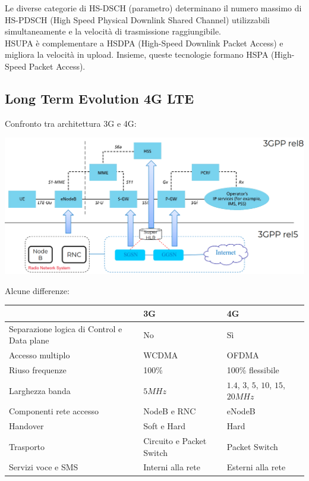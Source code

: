 Le diverse categorie di HS-DSCH (parametro) determinano il numero massimo di HS-PDSCH (High Speed Physical Downlink Shared Channel) utilizzabili simultaneamente e la velocità di trasmissione raggiungibile.\\

HSUPA è complementare a HSDPA (High-Speed Downlink Packet Access) e migliora la velocità in upload. Insieme, queste tecnologie formano HSPA (High-Speed Packet Access).\\


\newpage

\subsection{Long Term Evolution 4G LTE}

Confronto tra architettura 3G e 4G:
\begin{center}
	\includegraphics[width=0.95\linewidth]{img/mobile/3g4g}
\end{center}

Alcune differenze: 
\begin{center}
	\begin{tabular}{| m{3.5cm} | m{2cm} | m{2cm} |}
		\hline
		& 3G & 4G \\
		\hline
		Separazione logica di Control e Data plane &  No & Sì \\
		\hline
		Accesso multiplo  &WCDMA & OFDMA \\
		\hline
		Riuso frequenze & 100\% & 100\% flessibile \\
		\hline
		Larghezza banda & $5 MHz$ & $1.4$, $3$, $5$, $10$, $15$, $20 MHz$ \\
		\hline		
		Componenti rete accesso & NodeB e RNC & eNodeB \\
		\hline
		Handover & Soft e Hard & Hard \\
		\hline
		Trasporto & Circuito e Packet Switch & Packet Switch \\
		\hline
		Servizi voce e SMS & Interni alla rete & Esterni alla rete \\
		\hline
	\end{tabular}
\end{center}

